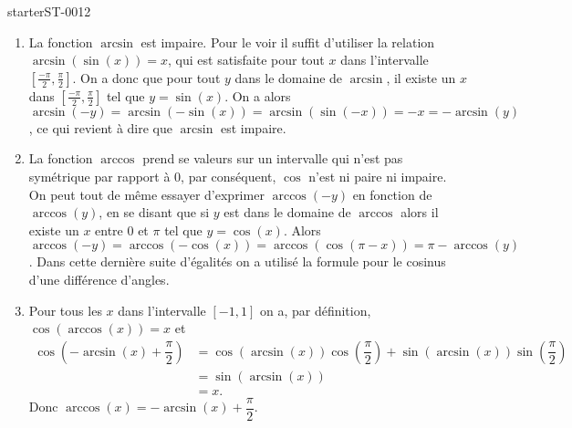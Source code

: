 
\begin{corrige}{starterST-0012}

 \begin{enumerate}
  \item La fonction $\arcsin$ est impaire. Pour le voir il suffit d'utiliser la relation $\arcsin(\sin(x)) =x$, qui est satisfaite pour tout $x$ dans l'intervalle $\displaystyle \left[\frac{-\pi}{2}, \frac{\pi}{2}\right]$. On a donc que pour tout $y$ dans le domaine de $\arcsin$, il existe un $x$ dans  $\displaystyle \left[\frac{-\pi}{2}, \frac{\pi}{2}\right]$ tel que $y=\sin(x)$. On a alors   $\arcsin(-y) = \arcsin(-\sin(x)) = \arcsin(\sin(-x))= -x = -\arcsin(y)$, ce qui revient à dire que $\arcsin$ est impaire.  
  \item La fonction $\arccos$ prend se valeurs sur un intervalle qui n'est pas symétrique par rapport à $0$, par conséquent, $\cos$ n'est ni paire ni impaire. On peut tout de m\^eme essayer d'exprimer $\arccos(-y)$ en fonction de $\arccos(y)$, en se disant que si $y$ est dans le domaine de $\arccos$ alors il existe un $x$ entre $0$ et $\pi$ tel que $y = \cos(x)$. Alors  $\arccos(-y) = \arccos(-\cos(x)) = \arccos (\cos(\pi-x)) = \pi- \arccos(y)$. Dans cette dernière suite d'égalités on a utilisé la formule pour le cosinus d'une différence d'angles. 
  \item Pour tous les $x$ dans l'intervalle $[-1,1]$ on a, par définition, $\cos(\arccos(x)) =x$ et 
      \begin{subequations}
          \begin{align}
            \cos\left(-\arcsin (x) +\dfrac{ \pi}{2}\right)& = \cos(\arcsin(x))\cos\left(\dfrac{ \pi}{2}\right)+\sin(\arcsin(x))\sin\left(\dfrac{ \pi}{2}\right)\\
            &= \sin(\arcsin(x))\\
            &= x. 
          \end{align}
      \end{subequations}
 Donc $\arccos(x) =  -\arcsin (x) + \dfrac{ \pi}{2}$.
    \end{enumerate}

\end{corrige}
